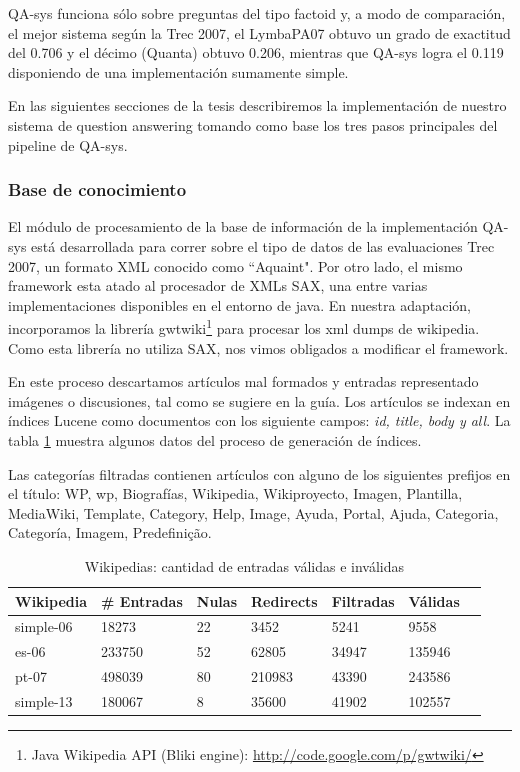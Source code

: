 QA-sys funciona sólo sobre preguntas del tipo factoid y, a modo de comparación, el mejor sistema según la Trec
2007, el LymbaPA07 obtuvo un grado de exactitud del 0.706 y el décimo (Quanta) obtuvo 0.206, mientras que QA-sys logra el 0.119 disponiendo de una implementación sumamente simple.

En las siguientes secciones de la tesis describiremos la implementación de nuestro sistema de question answering tomando como base los tres pasos principales del pipeline de QA-sys.

\subsubsection{Base de conocimiento}

El módulo de procesamiento de la base de información de la implementación QA-sys está desarrollada para correr sobre el tipo de datos de las evaluaciones Trec 2007, un formato XML conocido como ``Aquaint". Por otro lado, el mismo framework esta atado al procesador de XMLs SAX, una entre varias implementaciones disponibles en el entorno de java. En nuestra adaptación, incorporamos la librería gwtwiki\footnote{Java Wikipedia API (Bliki engine): \url{http://code.google.com/p/gwtwiki/}} para procesar los xml dumps de wikipedia. Como esta librería no utiliza SAX, nos vimos obligados a modificar el framework.

En este proceso descartamos artículos mal formados y entradas representado imágenes o discusiones, tal como se sugiere en la guía.
Los artículos se indexan en índices Lucene como documentos con los siguiente campos: \emph{id, title, body y all}.
La tabla \ref{table:creacion-indices} muestra algunos datos del proceso de generación de índices.

Las categorías filtradas contienen artículos con alguno de los siguientes prefijos en el título: WP, wp, Biografías, Wikipedia, Wikiproyecto, Imagen, Plantilla, MediaWiki, Template, Category, Help, Image, Ayuda, Portal, Ajuda, Categoria, Categoría, Imagem, Predefinição.


\begin{table}
\centering
\begin{center}
\begin{tabular}{| l | l | l | l | l | l| l|}
\hline
Wikipedia & \# Entradas & Nulas & Redirects & Filtradas & Válidas \\ \hline
simple-06 & 18273 & 22 &  3452 & 5241 & 9558  \\ \hline
es-06 & 233750 & 52 & 62805 & 34947 & 135946 \\ \hline
pt-07 & 498039 & 80 & 210983 & 43390 & 243586 \\ \hline
simple-13 & 180067 & 8 & 35600 & 41902 & 102557\\ \hline
\end{tabular}
\caption{Wikipedias: cantidad de entradas válidas e inválidas}
\label{table:creacion-indices}
\end{center}
\end{table}

